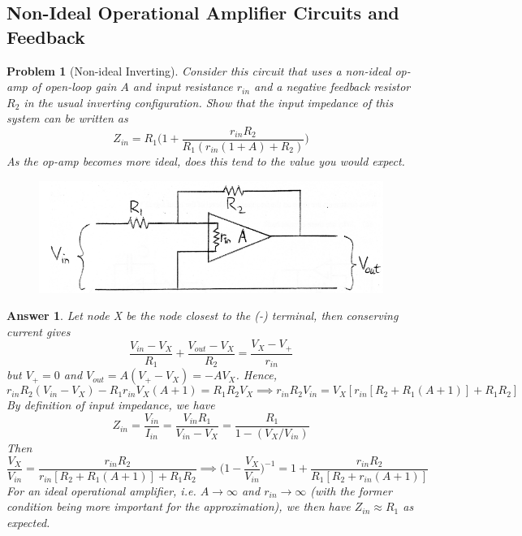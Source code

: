 \documentclass[a4paper]{article}
\newtheorem{ans}{Answer}[section]
\theoremstyle{new}
\newtheorem{qns}{Problem}[section]
\begin{document}
\subsection{Non-Ideal Operational Amplifier Circuits and Feedback}
\begin{qns}[Non-ideal Inverting]
Consider this circuit that uses a non-ideal op-amp of open-loop gain $A$ and input resistance $r_{in}$ and a negative feedback resistor $R_2$ in the usual inverting configuration. Show that the input impedance of this system can be written as
$$Z_{in}=R_1\bigg(1+\frac{r_{in}R_2}{R_1(r_{in}(1+A)+R_2)}\bigg)$$
As the op-amp becomes more ideal, does this tend to the value you would expect.
\end{qns}
\begin{figure}[H]
    \centering
    \includegraphics[scale=0.5]{1_3.PNG}
\end{figure}
\begin{ans}
Let node X be the node closest to the (-) terminal, then conserving current gives
$$\frac{V_{in}-V_X}{R_1}+\frac{V_{out}-V_X}{R_2}=\frac{V_X-V_+}{r_{in}}$$
but $V_+=0$ and $V_{out}=A(V_+-V_X)=-AV_X$. Hence,
$$r_{in}R_2(V_{in}-V_X)-R_1r_{in}V_X(A+1)=R_1R_2V_X\implies r_{in}R_2V_{in}=V_X[r_{in}[R_2+R_1(A+1)]+R_1R_2]$$
By definition of input impedance, we have $$Z_{in}=\frac{V_{in}}{I_{in}}=\frac{V_{in}R_1}{V_{in}-V_X}=\frac{R_1}{1-(V_X/V_{in})}$$
Then
$$\frac{V_X}{V_{in}}=\frac{r_{in}R_2}{r_{in}[R_2+R_1(A+1)]+R_1R_2}\implies\bigg(1-\frac{V_X}{V_{in}}\bigg)^{-1}=1+\frac{r_{in}R_2}{R_1[R_2+r_{in}(A+1)]}$$
For an ideal operational amplifier, i.e. $A\rightarrow\infty$ and $r_{in}\rightarrow\infty$ (with the former condition being more important for the approximation), we then have $Z_{in}\approx R_1$ as expected.
\end{ans}
\newpage
\end{document}
